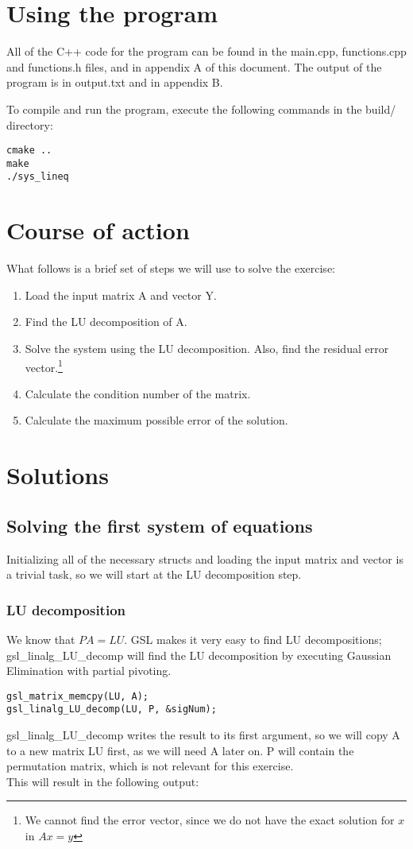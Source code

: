 \documentclass[11pt, a4paper, titlepage, openright]{article}
\begin{document}
\section{Using the program}
    All of the C++ code for the program can be found in the main.cpp, functions.cpp and functions.h files, 
    and in appendix A of this document. The output of the program is in output.txt and in appendix B.

    To compile and run the program, execute the following commands in the build/ directory:
\begin{lstlisting}
cmake ..
make
./sys_lineq
\end{lstlisting}

\newpage
\section{Course of action}
    What follows is a brief set of steps we will use to solve the exercise:
    \begin{enumerate}
        \item Load the input matrix A and vector Y.
        \item Find the LU decomposition of A.
        \item Solve the system using the LU decomposition.
            \subitem Also, find the residual error vector.\footnote{We cannot find the error vector, since we do not have the exact solution for \(x\) in \(Ax = y\)}
        \item Calculate the condition number of the matrix.
        \item Calculate the maximum possible error of the solution.
    \end{enumerate}
    
\bigskip
\section{Solutions}
\label{sec:solutions}
    \subsection{Solving the first system of equations}
        Initializing all of the necessary structs and loading the input matrix and vector 
        is a trivial task, so we will start at the LU decomposition step.
    \subsubsection{LU decomposition}
    We know that \(PA = LU\). GSL makes it very easy to find LU decompositions; gsl\_linalg\_LU\_decomp will find the LU 
    decomposition by executing Gaussian Elimination with partial pivoting.
\begin{lstlisting}
gsl_matrix_memcpy(LU, A);
gsl_linalg_LU_decomp(LU, P, &sigNum);
\end{lstlisting}
    gsl\_linalg\_LU\_decomp writes the result to its first argument, so we will copy A to a new matrix 
    LU first, as we will need A later on. P will contain the permutation matrix, which is not relevant for 
    this exercise. \\ This will result in the following output:
    
\end{document}
